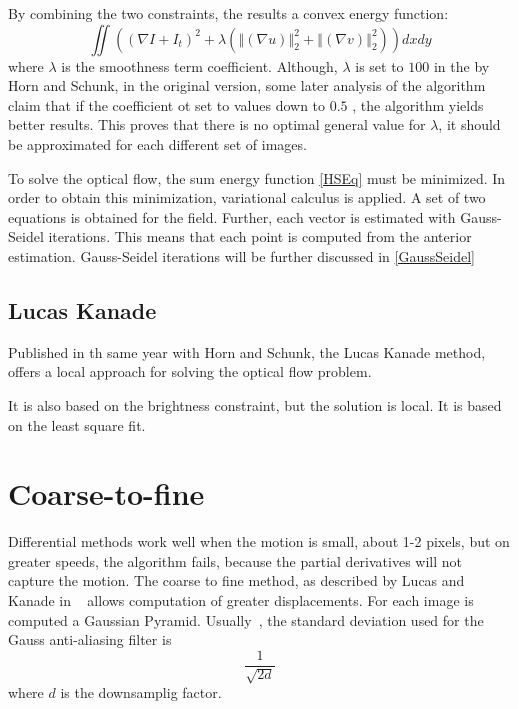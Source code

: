 \documentclass[12pt,a4paper,twoside]{report}
\begin{document}
By combining the two constraints, the results a convex energy function:
\begin{equation} \label{HSEq}
	\iint  ((\nabla I + I_t)^2 + \lambda(\left\Vert(\nabla u) \right\Vert_2^2 +\left\Vert(\nabla v) \right\Vert_2^2))dxdy
\end{equation}
where $\lambda$ is the smoothness term coefficient. Although, $\lambda$ is set to $100$ in the by Horn and Schunk, in the original version, some later analysis of the algorithm claim that if the coefficient ot set to values down to $0.5$ \cite{barron1994}, the algorithm yields better results. This proves that there is no optimal general value for $\lambda$, it should be approximated for each different set of images.

To solve the optical flow, the sum energy function \ref{HSEq} must be minimized. In order to obtain this minimization, variational calculus is applied. A set of two equations is obtained for the field.
Further, each vector is estimated with Gauss-Seidel iterations. This means that each point is computed from the anterior estimation. Gauss-Seidel iterations will be further discussed in \ref{GaussSeidel}


\subsection{Lucas Kanade}

Published in th same year with Horn and Schunk, the Lucas Kanade method, offers a local approach for solving the optical flow problem. 

It is also based on the brightness constraint, but the solution is local.
It is based on the least square fit.

\section{Coarse-to-fine}
Differential methods work well when the motion is small, about 1-2 pixels, but on greater speeds, the algorithm fails, because the partial derivatives will not capture the motion.
The coarse to fine method, as described by Lucas and Kanade in ~\cite{lucas1981} allows computation of greater displacements. For each image is computed a Gaussian Pyramid. Usually~\cite{sun2010}, the standard deviation used for the Gauss anti-aliasing filter is 
\begin{equation}
	\frac{1}{\sqrt{2d}}
\end{equation} where $d$ is the downsamplig factor.
\end{document}

